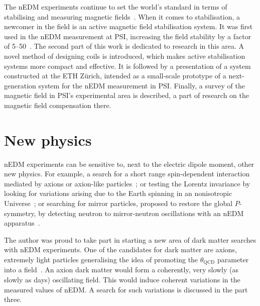 The nEDM experiments continue to set the world's standard in terms of stabilising and measuring magnetic fields~\cite{GREEN1998381,1748-0221-10-12-P12003,Groeger2005,Baker2014}. When it comes to stabilisation, a newcomer in the field is an active magnetic field stabilisation system. It was first used in the nEDM measurement at PSI, increasing the field stability by a factor of 5--50~\cite{Afach2014}. The second part of this work is dedicated to research in this area. A novel method of designing coils is introduced, which makes active stabilisation systems more compact and effective. It is followed by a presentation of a system constructed at the ETH Zürich, intended as a small-scale prototype of a next-generation system for the nEDM measurement in PSI. Finally, a survey of the magnetic field in PSI's experimental area is described, a part of research on the magnetic field compensation there.



\section{New physics}
nEDM experiments can be sensitive to, next to the electric dipole moment, other new physics. For example, a search for a short range spin-dependent interaction mediated by axions or axion-like particles~\cite{Afach2015Exotic}; or testing the Lorentz invariance by looking for variations arising due to the Earth spinning in an nonisotropic Universe~\cite{Altarev2009,ALTAREV20112365}; or searching for mirror particles, proposed to restore the global $P$-symmetry, by detecting neutron to mirror-neutron oscillations with an nEDM apparatus~\cite{PhysRevD.80.032003}.

The author was proud to take part in starting a new area of dark matter searches with nEDM experiments. One of the candidates for dark matter are axions, extremely light particles generalising the idea of promoting the $\theta_\text{QCD}$ parameter into a field~\cite{PhysRevLett.38.1440}. An axion dark matter would form a coherently, very slowly (as slowly as days) oscillating field. This would induce coherent variations in the measured values of nEDM. A search for such variations is discussed in the part three.